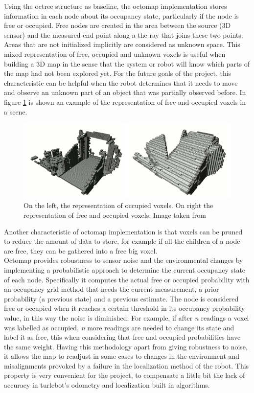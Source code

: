 \documentclass[fontsize=12pt]{article}
\begin{document}
Using the octree structure as baseline, the octomap implementation stores information in each node about its occupancy state, particularly if the node is free or occupied. Free nodes are created in the area between the  source (3D sensor) and the measured end point along a the ray that joins these two points. Areas that are not initialized implicitly are considered as unknown space. This mixed representation of free, occupied and unknown voxels is useful when building a 3D map in the sense  that the system or robot will know which parts of the map had not been explored yet. For the future goals of the project, this characteristic can be helpful when the robot determines that it needs to move and observe an unknown part of an object that was partially observed before.  In figure \ref{fig:octreefree} is shown an example of the representation of free and occupied voxels in a scene. 
\begin{figure}[H]
\begin{center}
\includegraphics[width=0.8\linewidth]{images/octofree}
\caption{On the left, the representation of occupied voxels. On right the representation of free and occupied voxels. Image taken from \cite{bib:octomap}}
\label{fig:octreefree}
\end{center}
\end{figure}
Another characteristic of octomap implementation is that voxels can be pruned to reduce the amount of data to store, for example if all the children of a node are free, they can be gathered into a free big voxel. \\
Octomap provides robustness to sensor noise and the environmental changes by implementing a probabilistic approach to determine the current occupancy state of each node. Specifically it computes the actual free or occupied probability with an occupancy grid method that needs the current measurement, a prior probability (a previous state) and a previous estimate. The node is considered free or occupied when it reaches a certain threshold in its occupancy probability value, in this way the noise is diminished. For example, if after \textit{n} readings a voxel was labelled as occupied,  \textit{n} more readings are needed to change its state and label it as free, this when considering that free and occupied probabilities  have the same weight. Having this methodology apart from giving robustness to noise, it allows the map to readjust in some cases to changes in the environment and  misalignments provoked by a failure in the localization method of the robot. This property is very convenient for the project, to compensate a little bit the lack of accuracy in turlebot's odometry and localization built in algorithms.
\end{document}
